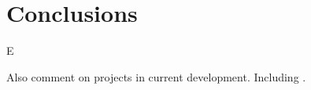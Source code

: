 \chapter{Conclusions}
\label{cha:conclusion}

E

Also comment on projects in current development. Including \cite{ID70, ID72}.

